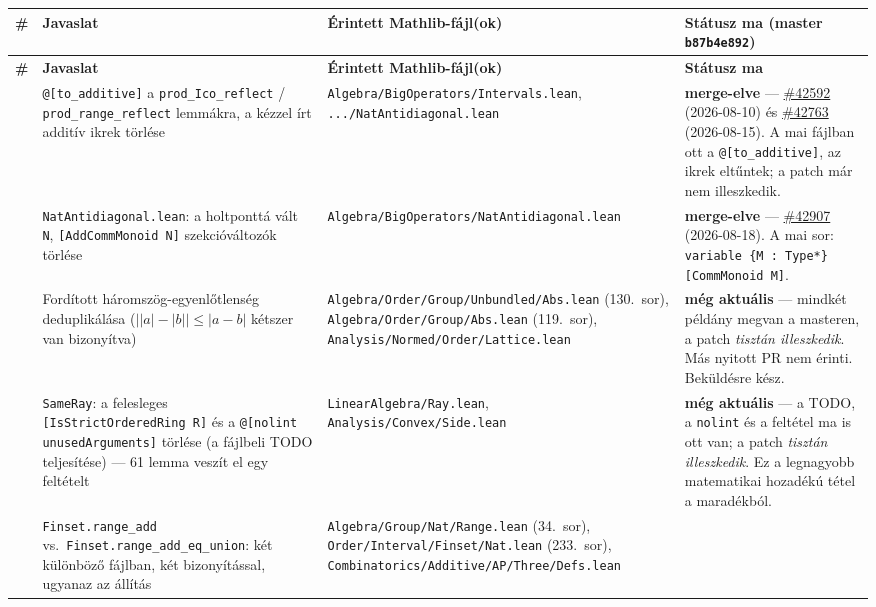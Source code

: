 \documentclass[11pt,a4paper]{article}
\newcommand{\lean}[1]{\texttt{\small #1}}
\newcommand{\bk}{\allowbreak}
\newcommand{\pr}[1]{\href{https://github.com/leanprover-community/mathlib4/pull/#1}{\##1}}
\newcommand{\OK}{\textcolor{green!45!black}{\textbf{merge-elve}}}
\newcommand{\EL}{\textcolor{blue!55!black}{\textbf{még aktuális}}}
\begin{document}
\begingroup
\small
\begin{longtable}{@{}>{\raggedright\arraybackslash}p{0.45cm}>{\raggedright\arraybackslash}p{4.4cm}>{\raggedright\arraybackslash}p{4.2cm}>{\raggedright\arraybackslash}p{5.2cm}@{}}
\toprule
\textbf{\#} & \textbf{Javaslat} & \textbf{Érintett Mathlib-fájl(ok)} & \textbf{Státusz ma (master \lean{b87b4e892})}\\
\midrule
\endfirsthead
\toprule
\textbf{\#} & \textbf{Javaslat} & \textbf{Érintett Mathlib-fájl(ok)} & \textbf{Státusz ma}\\
\midrule
\endhead
\bottomrule
\endfoot
1 & \lean{@[to\_\bk additive]} a \lean{prod\_\bk Ico\_\bk reflect} / \lean{prod\_\bk range\_\bk reflect} lemmákra, a kézzel írt additív ikrek törlése
  & \lean{Algebra/\bk BigOperators/\bk Intervals.\bk lean}, \lean{.\bk .\bk .\bk /\bk NatAntidiagonal.\bk lean}
  & \OK{} --- \pr{42592} (2026-08-10) és \pr{42763} (2026-08-15). A mai fájlban ott a \lean{@[to\_\bk additive]}, az ikrek eltűntek; a patch már nem illeszkedik.\\
\addlinespace
2 & \lean{NatAntidiagonal.\bk lean}: a holtponttá vált \lean{N}, \lean{[AddCommMonoid N]} szekcióváltozók törlése
  & \lean{Algebra/\bk BigOperators/\bk NatAntidiagonal.\bk lean}
  & \OK{} --- \pr{42907} (2026-08-18). A mai sor: \lean{variable \{M : Type*\} [CommMonoid M]}.\\
\addlinespace
3 & Fordított háromszög-egyenlőtlenség deduplikálása ($\bigl||a|-|b|\bigr|\le|a-b|$ kétszer van bizonyítva)
  & \lean{Algebra/\bk Order/\bk Group/\bk Unbundled/\bk Abs.\bk lean} (130.\ sor), \lean{Algebra/\bk Order/\bk Group/\bk Abs.\bk lean} (119.\ sor), \lean{Analysis/\bk Normed/\bk Order/\bk Lattice.\bk lean}
  & \EL{} --- mindkét példány megvan a masteren, a patch \emph{tisztán illeszkedik}. Más nyitott PR nem érinti. Beküldésre kész.\\
\addlinespace
4 & \lean{SameRay}: a felesleges \lean{[IsStrictOrderedRing R]} és a \lean{@[nolint unusedArguments]} törlése (a fájlbeli TODO teljesítése) --- 61 lemma veszít el egy feltételt
  & \lean{LinearAlgebra/\bk Ray.\bk lean}, \lean{Analysis/\bk Convex/\bk Side.\bk lean}
  & \EL{} --- a TODO, a \lean{nolint} és a feltétel ma is ott van; a patch \emph{tisztán illeszkedik}. Ez a legnagyobb matematikai hozadékú tétel a maradékból.\\
\addlinespace
5 & \lean{Finset.\bk range\_\bk add} vs.\ \lean{Finset.\bk range\_\bk add\_\bk eq\_\bk union}: két különböző fájlban, két bizonyítással, ugyanaz az állítás
  & \lean{Algebra/\bk Group/\bk Nat/\bk Range.\bk lean} (34.\ sor), \lean{Order/\bk Interval/\bk Finset/\bk Nat.\bk lean} (233.\ sor), \lean{Combinatorics/\bk Additive/\bk AP/\bk Three/\bk Defs.\bk lean}

\end{longtable}
\end{document}
